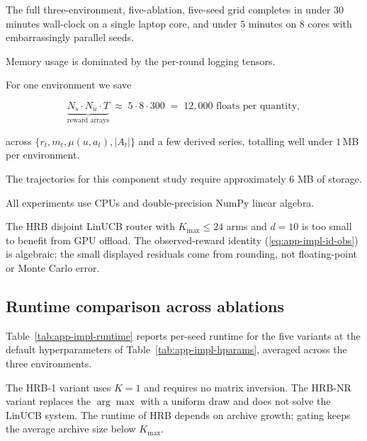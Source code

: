 \documentclass{article} %
\renewcommand{\eqref}[1]{\textup{(\ref{#1})}}
\begin{document}
The full three-environment, five-ablation, five-seed grid completes in under $30$ minutes wall-clock on a single laptop core, and under $5$ minutes on $8$ cores with embarrassingly parallel seeds.

Memory usage is dominated by the per-round logging tensors.

For one environment we save

\begin{equation}
\label{eq:app-impl-storage}
\underbrace{N_s \cdot N_u \cdot T}_{\text{reward arrays}} \;\approx\; 5 \cdot 8 \cdot 300 \;=\; 12{,}000 \text{ floats per quantity},
\end{equation}

across $\{r_t, m_t, \mu(u,a_t), |A_t|\}$ and a few derived series, totalling well under $1$\,MB per environment.

The trajectories for this component study require approximately \(6\) MB
of storage.

All experiments use CPUs and double-precision NumPy linear algebra.

The HRB disjoint LinUCB router with \(K_{\max}\le24\) arms and \(d=10\) is too small to
benefit from GPU offload. The observed-reward identity
\eqref{eq:app-impl-id-obs} is algebraic; the small displayed residuals come
from rounding, not floating-point or Monte Carlo error.

\subsection{Runtime comparison across ablations}

\label{app:impl-runtime}

Table~\ref{tab:app-impl-runtime} reports per-seed runtime for the five variants at the default hyperparameters of Table~\ref{tab:app-impl-hparams}, averaged across the three environments.

The \textnormal{HRB-1} variant uses $K=1$ and requires no matrix inversion.
The \textnormal{HRB-NR} variant replaces the $\arg\max$ with a uniform draw
and does not solve the LinUCB system. The runtime of \textnormal{HRB} depends on
archive growth; gating keeps the average archive size below $K_{\max}$.
\end{document}
